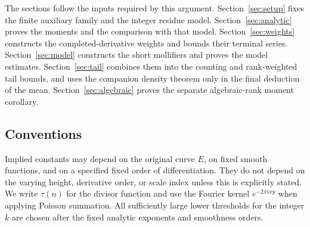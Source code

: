 The sections follow the inputs required by this argument.
Section~\ref{sec:setup} fixes the finite auxiliary family and the integer
residue model. Section~\ref{sec:analytic} proves the moments and the
comparison with that model. Section~\ref{sec:weights} constructs the
completed-derivative weights and bounds their terminal series.
Section~\ref{sec:model} constructs the short mollifiers and proves the
model estimates. Section~\ref{sec:tail} combines them into the counting
and rank-weighted tail bounds, and uses the companion density theorem
only in the final deduction of the mean. Section~\ref{sec:algebraic}
proves the separate algebraic-rank moment corollary.

\subsection{Conventions}

Implied constants may depend on the original curve \(E\), on fixed
smooth functions, and on a specified fixed order of differentiation.
They do not depend on the varying height, derivative order, or scale
index unless this is explicitly stated.
We write \(\tau(n)\) for the divisor function and use the Fourier kernel
\(e^{-2\pi ixy}\) when applying Poisson summation.
All sufficiently large lower thresholds for the integer \(k\) are
chosen after the fixed analytic exponents and smoothness orders.
